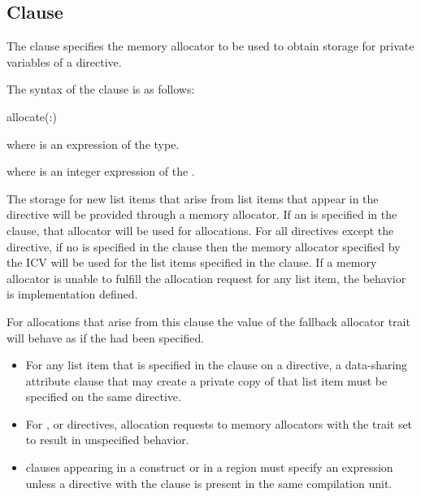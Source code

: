 \subsection{ Clause}
\label{subsec:allocate Clause}
\summary
The  clause specifies the memory allocator to be used to 
obtain storage for private variables of a directive.

\syntax

The syntax of the  clause is as follows:

\begin{ompSyntax}
allocate(\plc{[allocator}:\plc{] list})
\end{ompSyntax}

\begin{ccppspecific}
where  is an expression of the  type.
\end{ccppspecific}

\begin{fortranspecific}
where  is an integer expression of the  
.
\end{fortranspecific}

\descr

The storage for new list items that arise from list items that appear in the 
directive will be provided through a memory allocator. If an  
is specified in the clause, that allocator will be used for allocations. For 
all directives except the  directive, if no  is 
specified in the clause then the memory allocator specified by the 
 ICV will be used for the list items specified in the 
 clause. If a memory allocator is unable to fulfill the 
allocation request for any list item, the behavior is implementation defined.

For allocations that arise from this clause the  value of the 
fallback allocator trait will behave as if the  had been specified.

\restrictions
\begin{itemize}
\item For any list item that is specified in the  clause on a 
      directive, a data-sharing attribute clause that may create a private copy 
      of that list item must be specified on the same directive.
\item For ,  or  directives, allocation 
      requests to memory allocators with the trait  set to 
       result in unspecified behavior.
\item {} clauses appearing in a  construct or in a 
       region must specify an  expression unless 
      a  directive with the  clause 
      is present in the same compilation unit.
\end{itemize}

